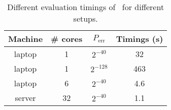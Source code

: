 \begin{table}[H]
\centering
\caption{Different evaluation timings of \hippo~for different setups.}
\label{tab:bonus}
\begin{tabular}{|c|c|c|c|}
\hline
Machine       &  \# cores    & $P_{\text{err}}$          & Timings (s) \\ \hline
laptop        &  1           & $2^{-40}$          &  32         \\ \hline
laptop        &  1           & $2^{-128}$         &  463        \\ \hline
laptop        &  6           & $2^{-40}$          &  4.6        \\ \hline
server        &  32         & $2^{-40}$          &  1.1       \\ \hline
\end{tabular}
\end{table}